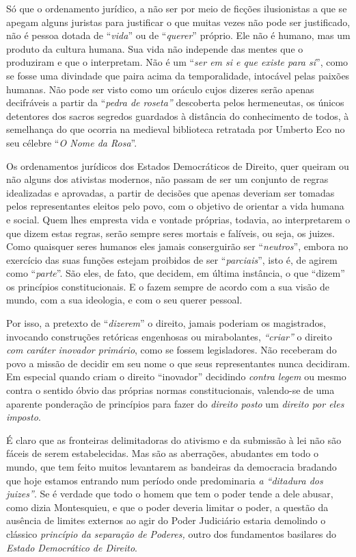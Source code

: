 Só que o ordenamento jurídico, a não ser por meio de ficções
ilusionistas a que se apegam alguns juristas para justificar o que
muitas vezes não pode ser justificado, não é pessoa dotada de
``\emph{vida}'' ou de ``\emph{querer}'' próprio. Ele não é humano, mas
um produto da cultura humana. Sua vida não independe das mentes que o
produziram e que o interpretam. Não é um ``\emph{ser em si e que existe
para si}'', como se fosse uma divindade que paira acima da
temporalidade, intocável pelas paixões humanas. Não pode ser visto como
um oráculo cujos dizeres serão apenas decifráveis a partir da
``\emph{pedra de roseta''} descoberta pelos hermeneutas, os únicos
detentores dos sacros segredos guardados à distância do conhecimento de
todos, à semelhança do que ocorria na medieval biblioteca retratada por
Umberto Eco no seu célebre ``\emph{O Nome da Rosa}''.

Os ordenamentos jurídicos dos Estados Democráticos de Direito, quer
queiram ou não alguns dos ativistas modernos, não passam de ser um
conjunto de regras idealizadas e aprovadas, a partir de decisões que
apenas deveriam ser tomadas pelos representantes eleitos pelo povo, com
o objetivo de orientar a vida humana e social. Quem lhes empresta vida e
vontade próprias, todavia, ao interpretarem o que dizem estas regras,
serão sempre seres mortais e falíveis, ou seja, os juizes. Como
quaisquer seres humanos eles jamais conserguirão ser ``\emph{neutros}'',
embora no exercício das suas funções estejam proibidos de ser
``\emph{parciais}'', isto é, de agirem como ``\emph{parte}''. São eles,
de fato, que decidem, em última instância, o que ``dizem'' os princípios
constitucionais. E o fazem sempre de acordo com a sua visão de mundo,
com a sua ideologia, e com o seu querer pessoal.

Por isso, a pretexto de ``\emph{dizerem}'' o direito, jamais poderiam os
magistrados, invocando construções retóricas engenhosas ou mirabolantes,
\emph{``criar''} o direito \emph{com caráter inovador primário}, como se
fossem legisladores. Não receberam do povo a missão de decidir em seu
nome o que seus representantes nunca decidiram. Em especial quando criam
o direito ``inovador'' decidindo \emph{contra legem} ou mesmo contra o
sentido óbvio das próprias normas constitucionais, valendo-se de uma
aparente ponderação de princípios para fazer do \emph{direito posto} um
\emph{direito por eles imposto}.

É claro que as fronteiras delimitadoras do ativismo e da submissão à lei
não são fáceis de serem estabelecidas. Mas são as aberrações, abudantes
em todo o mundo, que tem feito muitos levantarem as bandeiras da
democracia bradando que hoje estamos entrando num período onde
predominaria \emph{a ``ditadura dos juizes''}. Se é verdade que todo o
homem que tem o poder tende a dele abusar, como dizia Montesquieu, e que
o poder deveria limitar o poder, a questão da ausência de limites
externos ao agir do Poder Judiciário estaria demolindo o clássico
\emph{princípio da separação de Poderes,} outro dos fundamentos
basilares do \emph{Estado Democrático de Direito}.

